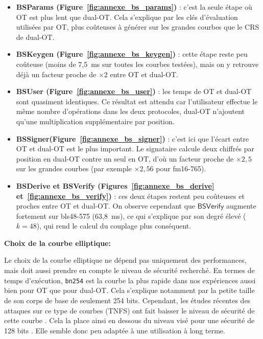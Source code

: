 \documentclass[10pt,a4paper]{article}
\theoremstyle{definition}
\theoremstyle{plain}
\theoremstyle{remark}
\begin{document}
\begin{itemize}
    \item \textbf{BSParams (Figure~\ref{fig:annexe_bs_params})} :
    c'est la seule étape où OT est plus lent que dual-OT. Cela s'explique par les clés
    d'évaluation utilisées par OT, plus coûteuses à générer
    sur les grandes courbes que le CRS de dual-OT.

    \item \textbf{BSKeygen (Figure~\ref{fig:annexe_bs_keygen})} :
    cette étape reste peu coûteuse (moins de 7,5~ms sur toutes les courbes testées), mais
    on y retrouve déjà un facteur proche de $\times 2$ entre OT et dual-OT.

    \item \textbf{BSUser (Figure~\ref{fig:annexe_bs_user})} :
    les temps de OT et dual-OT sont quasiment identiques. Ce résultat est attendu car
    l'utilisateur effectue le même nombre d'opérations dans les deux protocoles, dual-OT
    n'ajoutent qu'une multiplication supplémentaire par position.

    \item \textbf{BSSigner(Figure~\ref{fig:annexe_bs_signer})} :
    c'est ici que l'écart entre OT et dual-OT est le plus important. Le signataire calcule
    deux chiffrés par position en dual-OT contre un seul en OT, d'où un facteur proche de
    $\times 2{,}5$ sur les grandes courbes (par exemple $\times 2{,}56$ pour fm16-765).

    \item \textbf{BSDerive et BSVerify (Figures~\ref{fig:annexe_bs_derive}
    et~\ref{fig:annexe_bs_verify})} :
    ces deux étapes restent peu coûteuses et proches entre OT et dual-OT. On observe
    cependant que $\mathsf{BSVerify}$ augmente fortement sur bls48-575 (63,8~ms), ce qui
    s'explique par son degré élevé ($k=48$), qui rend le calcul du couplage plus conséquent.\\
\end{itemize}


\noindent \textbf{Choix de la courbe elliptique:\\} 

Le choix de la courbe elliptique ne dépend pas uniquement des performances, 
mais doit aussi prendre en compte le niveau de sécurité recherché.
En termes de temps d'exécution, \texttt{bn254} est la courbe la plus rapide dans nos expériences 
aussi bien pour OT que pour dual-OT. 
Cela s'explique notamment par la petite taille de son corps de base de seulement 254 bits.
Cependant, les études récentes des attaques sur ce type de courbes (TNFS) 
ont fait baisser le niveau de sécurité de cette courbe \cite{afg2024}. 
Cela la place ainsi en dessous du niveau visé pour une sécurité de 128 bits \cite{guillevic2025}.
Elle semble donc peu adaptée à une utilisation à long terme.
\end{document}
